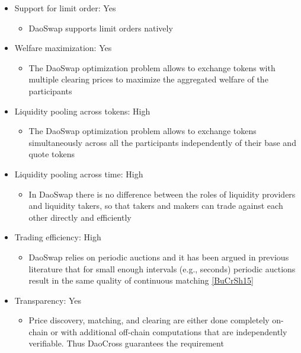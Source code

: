 \documentclass[11pt, reqno]{amsart}
\theoremstyle{definition}
\theoremstyle{remark}
\begin{document}
\begin{itemize}

	\item Support for limit order: Yes
	      \begin{itemize}
		      \item DaoSwap supports limit orders natively
	      \end{itemize}
	\item Welfare maximization: Yes
	      \begin{itemize}
		      \item The DaoSwap optimization problem allows to exchange tokens with multiple
                clearing prices to maximize the aggregated welfare of the participants
	      \end{itemize}
	\item Liquidity pooling across tokens: High
	      \begin{itemize}
		      \item The DaoSwap optimization problem allows to exchange tokens simultaneously across 
                all the participants independently of their base and quote tokens
	      \end{itemize}
	\item Liquidity pooling across time: High
	      \begin{itemize}
              \item In DaoSwap there is no difference between the roles of
                liquidity providers and liquidity takers, so that takers and makers
                can trade against each other directly and efficiently
	      \end{itemize}
	\item Trading efficiency: High
	      \begin{itemize}
              \item DaoSwap relies on periodic auctions and it has been argued
                in previous literature that for small enough intervals (e.g.,
                seconds) periodic auctions result in the same quality of
                continuous matching \ref{BuCrSh15}
	      \end{itemize}
	\item Transparency: Yes
	      \begin{itemize}
              \item Price discovery, matching, and clearing are either done
                completely on-chain or with additional off-chain computations that are
                independently verifiable. Thus DaoCross guarantees the requirement

\end{itemize}
\end{itemize}
\end{document}
